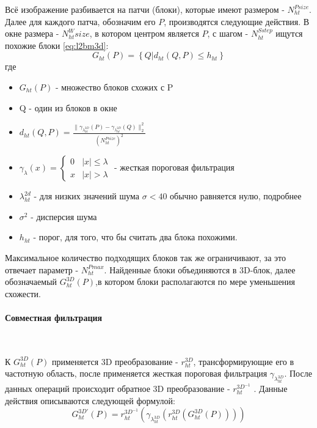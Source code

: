 Всё изображение разбивается на патчи (блоки), которые имеют размером - $N_{ht}^{Psize}$.  Далее для каждого патча, обозначим его $P$, производятся следующие действия. В окне размера - $N_{ht}^Wsize$, в котором центром является $P$, с шагом - $N_{ht}^{Sstep}$ ищутся похожие блоки  \ref{eq:l2bm3d}:
\begin{equation}\label{eq:l2bm3d}
	G_{ht}(P) = \left\{Q | d_{ht}(Q,P) \leq h_{ht}\right\}
\end{equation}
где
\begin{itemize}
	\item $G_{ht}(P)$ - множество блоков схожих с P
	\item Q - один из блоков в окне
	\item $d_{ht}(Q,P) = \frac{\parallel\gamma_{\lambda_{ht}^{2D}}(P)-\gamma_{\lambda_{ht}^{2D}}(Q)\parallel_2^2}{(N_{ht}^{Psize})^2}$
	\item $\gamma_{\lambda}(x) = \begin{cases}0 &|x| \leq \lambda\\ x & |x| > \lambda\end{cases}$ - жесткая пороговая фильтрация 
	\item $\lambda_{ht}^{2d}$ - для низких значений шума $\sigma < 40$ обычно равняется нулю, подробнее \cite{dabov}
	\item $\sigma^2$ -  дисперсия шума
	\item $h_{ht}$ - порог, для того, что бы считать два блока похожими.
\end{itemize}
Максимальное количество подходящих блоков так же ограничивают, за это отвечает параметр - $N_{ht}^{Pmax}$. Найденные блоки объединяются в 3D-блок, далее обозначаемый $G_{ht}^{3D}(P)$,в котором блоки располагаются по мере уменьшения схожести.

\paragraph{Совместная фильтрация}\

К $G_{ht}^{3D}(P)$ применяется 3D преобразование - $r_{ht}^{3D}$, трансформирующие его в частотную область, после применяется жесткая пороговая фильтрация $\gamma_{\lambda_{ht}^{3D}}$. После данных операций происходит обратное 3D преобразование - $r_{ht}^{3D^{-1}}$ . Данные действия описываются следующей формулой:
\begin{equation}
G_{ht}^{3D'}(P) = r_{ht}^{3D^{-1}}(\gamma_{\lambda_{ht}^{3D}}(r_{ht}^{3D}(G_{ht}^{3D}(P))))
\end{equation}

